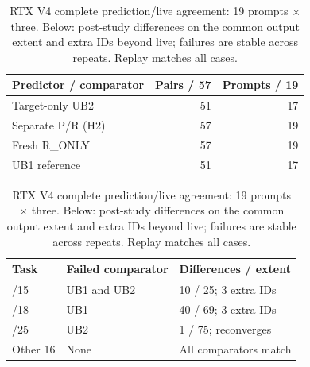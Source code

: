 \begin{table}[t]
\caption{RTX V4 complete prediction/live agreement: 19 prompts $\times$ three. Below: post-study differences on the common output extent and extra IDs beyond live; failures are stable across repeats. Replay matches all cases.}
\label{tab:rtxv4trajectory}
\centering
\begin{tabular}{@{}lrr@{}}
\toprule
Predictor / comparator & Pairs / 57 & Prompts / 19 \\
\midrule
Target-only UB2 & 51 & 17 \\
Separate P/R (H2) & 57 & 19 \\
Fresh R\_ONLY & 57 & 19 \\
UB1 reference & 51 & 17 \\
\bottomrule
\end{tabular}
\par\smallskip
\begin{tabular}{@{}lll@{}}
\toprule
Task & Failed comparator & Differences / extent \\
\midrule
/15 & UB1 and UB2 & 10 / 25; 3 extra IDs \\
/18 & UB1 & 40 / 69; 3 extra IDs \\
/25 & UB2 & 1 / 75; reconverges \\
Other 16 & None & All comparators match \\
\bottomrule
\end{tabular}
\end{table}
